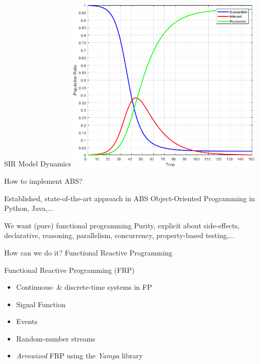 \documentclass{beamer}
\begin{document}
\begin{frame}{SIR Model Dynamics}
  \center
  \includegraphics[width=0.7\textwidth]{./fig/SIR_SD_001dt.png}
\end{frame}

\begin{frame}{How to implement ABS?}
  \begin{block}{Established, state-of-the-art approach in ABS}
	Object-Oriented Programming in Python, Java,...
  \end{block}
  
  \begin{block}{We want (pure) functional programming}
	Purity, explicit about side-effects, declarative, reasoning, parallelism, concurrency, property-based testing,...
  \end{block}
  
  \begin{block}{How can we do it?}
  	Functional Reactive Programming
  \end{block}
\end{frame}

\begin{frame}{Functional Reactive Programming (FRP)}
  \begin{itemize}
    \item Continuous- \& discrete-time systems in FP
 	\item Signal Function 
 	\item Events
 	\item Random-number streams
 	\item \textit{Arrowized} FRP using the \textit{Yampa} library
  \end{itemize}
\end{frame}
\end{document}
